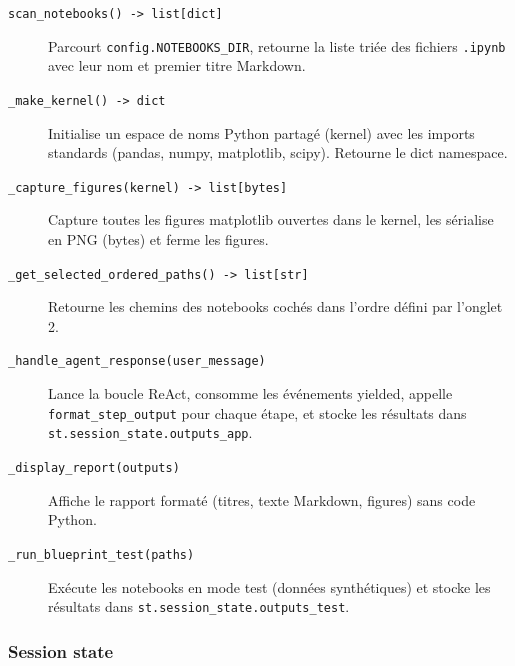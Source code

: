 \documentclass[11pt,a4paper]{article}
\begin{document}
\begin{description}
  \item[\texttt{scan\_notebooks() -> list[dict]}]
    Parcourt \texttt{config.NOTEBOOKS\_DIR}, retourne la liste triée des fichiers
    \texttt{.ipynb} avec leur nom et premier titre Markdown.

  \item[\texttt{\_make\_kernel() -> dict}]
    Initialise un espace de noms Python partagé (kernel) avec les imports standards
    (pandas, numpy, matplotlib, scipy). Retourne le dict namespace.

  \item[\texttt{\_capture\_figures(kernel) -> list[bytes]}]
    Capture toutes les figures matplotlib ouvertes dans le kernel, les sérialise
    en PNG (bytes) et ferme les figures.

  \item[\texttt{\_get\_selected\_ordered\_paths() -> list[str]}]
    Retourne les chemins des notebooks cochés dans l'ordre défini par l'onglet 2.

  \item[\texttt{\_handle\_agent\_response(user\_message)}]
    Lance la boucle ReAct, consomme les événements yielded, appelle
    \texttt{format\_step\_output} pour chaque étape, et stocke les résultats
    dans \texttt{st.session\_state.outputs\_app}.

  \item[\texttt{\_display\_report(outputs)}]
    Affiche le rapport formaté (titres, texte Markdown, figures) sans code Python.

  \item[\texttt{\_run\_blueprint\_test(paths)}]
    Exécute les notebooks en mode test (données synthétiques) et stocke les résultats
    dans \texttt{st.session\_state.outputs\_test}.
\end{description}

\subsubsection{Session state}
\end{document}
